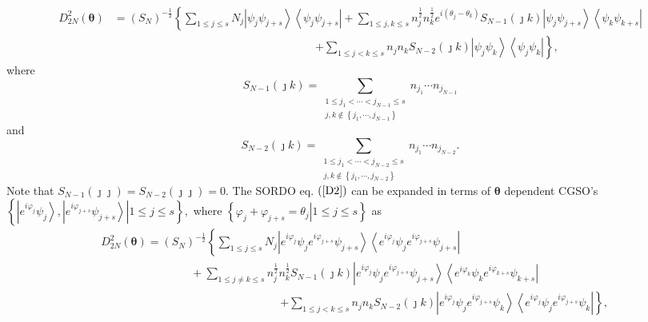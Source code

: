 \documentclass[aps,preprint]{revtex4}%
\begin{document}
\begin{align}
D_{2N}^{2}\left(  \mathbf{\theta}\right)   &  =\left(  S_{N}\right)
^{-\frac{1}{2}}\left\{  \sum_{1\leq j\leq s}N_{j}\left\vert \psi_{j}\psi
_{j+s}\right\rangle \left\langle \psi_{j}\psi_{j+s}\right\vert +\sum_{1\leq
j,k\leq s}n_{j}^{\frac{1}{2}}n_{k}^{\frac{1}{2}}e^{i\left(  \theta_{j}%
-\theta_{k}\right)  }S_{N-1}\left(  \jmath k\right)  \left\vert \psi_{j}%
\psi_{j+s}\right\rangle \left\langle \psi_{k}\psi_{k+s}\right\vert \right.
\nonumber\\
&  \qquad\qquad\qquad\qquad\qquad\qquad\qquad\qquad\qquad\left.  +\sum_{1\leq
j<k\leq s}n_{j}n_{k}S_{N-2}\left(  \jmath k\right)  \left\vert \psi_{j}%
\psi_{k}\right\rangle \left\langle \psi_{j}\psi_{k}\right\vert \right\}  ,
\label{D2}%
\end{align}
where
\begin{equation}
S_{N-1}\left(  \jmath k\right)  =\sum_{\substack{1\leq j_{1}<\cdots
<j_{N-1}\leq s\\j,k\notin\left\{  j_{1},\cdots,j_{N-1}\right\}  }}n_{j_{1}%
}\cdots n_{j_{N-1}}%
\end{equation}
and
\begin{equation}
S_{N-2}\left(  \jmath k\right)  =\sum_{\substack{1\leq j_{1}<\cdots
<j_{N-2}\leq s\\j,k\notin\left\{  j_{1},\cdots,j_{N-2}\right\}  }}n_{j_{1}%
}\cdots n_{j_{N-2}}.
\end{equation}
Note that $S_{N-1}\left(  \jmath\jmath\right)  =S_{N-2}\left(  \jmath
\jmath\right)  =0.$ The SORDO eq. $\left(  \ref{D2}\right)  $ can be expanded
in terms of $\mathbf{\theta}$ dependent CGSO's $\left\{  \left.  \left\vert
e^{i\varphi_{j}}\psi_{j}\right\rangle ,\left\vert e^{i\varphi_{j+s}}\psi
_{j+s}\right\rangle \right\vert 1\leq j\leq s\right\}  ,$ where $\left\{
\left.  \varphi_{j}+\varphi_{j+s}=\theta_{j}\right\vert 1\leq j\leq s\right\}
$ as
\begin{align}
&  D_{2N}^{2}\left(  \mathbf{\theta}\right)  =\left(  S_{N}\right)
^{-\frac{1}{2}}\left\{  \sum_{1\leq j\leq s}N_{j}\left\vert e^{i\varphi_{j}%
}\psi_{j}e^{i\varphi_{j+s}}\psi_{j+s}\right\rangle \left\langle e^{i\varphi
_{j}}\psi_{j}e^{i\varphi_{j+s}}\psi_{j+s}\right\vert \right. \nonumber\\
&  \qquad\qquad\qquad\qquad+\sum_{1\leq j\neq k\leq s}n_{j}^{\frac{1}{2}}%
n_{k}^{\frac{1}{2}}S_{N-1}\left(  \jmath k\right)  \left\vert e^{i\varphi_{j}%
}\psi_{j}e^{i\varphi_{j+s}}\psi_{j+s}\right\rangle \left\langle e^{i\varphi
_{k}}\psi_{k}e^{i\varphi_{k+s}}\psi_{k+s}\right\vert \nonumber\\
&  \qquad\qquad\qquad\qquad\qquad\qquad\qquad\qquad\left.  +\sum_{1\leq
j<k\leq s}n_{j}n_{k}S_{N-2}\left(  \jmath k\right)  \left\vert e^{i\varphi
_{j}}\psi_{j}e^{i\varphi_{j+s}}\psi_{k}\right\rangle \left\langle
e^{i\varphi_{j}}\psi_{j}e^{i\varphi_{j+s}}\psi_{k}\right\vert \right\}  ,
\label{en2}%
\end{align}
\end{document}
